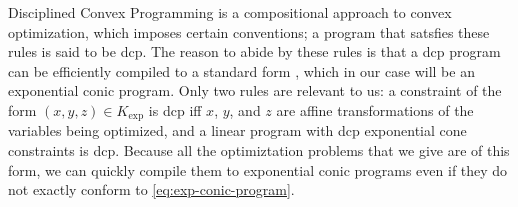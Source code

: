 \documentclass{article}
\begin{document}
Disciplined Convex Programming \parencite{dcp-thesis} is a
compositional approach to convex optimization, which imposes certain conventions; 
a program that satsfies these rules is said to be dcp.
The reason to abide by these rules is that a dcp program can be efficiently compiled to a
standard form \parencite{agrawal2018rewriting}, 
which in our case will be an exponential conic program.
Only two rules are relevant to us: a constraint of the form
$(x,y,z) \in K_{\exp}$ is dcp iff $x$, $y$, and $z$ are affine transformations of the variables being optimized, 
and a linear program with dcp exponential cone constraints is dcp.
Because all the optimiztation problems that we give are
of this form,
we can quickly compile them
to exponential conic programs even if they do not exactly conform to \eqref{eq:exp-conic-program}.
\end{document}
